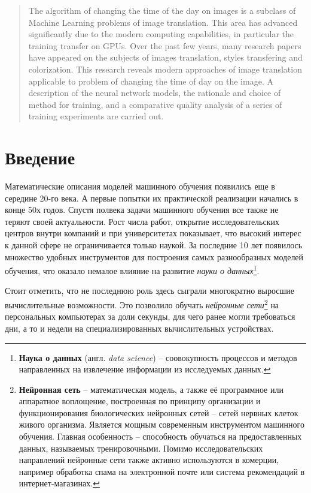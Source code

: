 \documentclass[11pt,a4paper]{extarticle}
\begin{document}
\begin{abstract}
	The algorithm of changing the time of the day on images is a subclass of Machine Learning problems of image translation.
	This area has advanced significantly due to the modern computing capabilities, in particular the training transfer on GPUs.
	Over the past few years, many research papers have appeared on the subjects of images translation, styles transfering and colorization.
	This research reveals modern approaches of image translation applicable to problem of changing the time of day on the image.
	A description of the neural network models, the rationale and choice of method for training, and a comparative quality analysis of a series of training experiments are carried out.
\end{abstract}

\newpage
\tableofcontents
\newpage

\section{Введение}
	Математические описания моделей машинного обучения появились еще в середине 20-го века.
	А первые попытки их практической реализации начались в конце 50х годов.
	Спустя полвека задачи машинного обучения все также не теряют своей актуальности.
	Рост числа работ, открытие исследовательских центров внутри компаний и при университетах показывает,
	что высокий интерес к данной сфере не ограничивается только наукой.
	За последние 10 лет появилось множество удобных инструментов для построения самых разнообразных моделей обучения, что оказало немалое влияние на развитие \textit{науки о данных}\footnote{
		\textbf{Наука о данных} (англ. \textit{data science}) -- соовокупность процессов и методов направленных на извлечение информации из исследуемых данных.
	}.  
	
	Стоит отметить, что не последнюю роль здесь сыграли многократно выросшие вычислительные возможности. 
	Это позволило обучать \textit{нейронные сети}\footnote{
		\textbf{Нейронная сеть} --  математическая модель, а также её программное или аппаратное воплощение, 
		построенная по принципу организации и функционирования биологических нейронных сетей -- сетей нервных клеток живого организма.
		Является мощным современным инструментом машинного обучения.
		Главная особенность -- способность обучаться на предоставленных данных, называемых тренировочными.
		Помимо исследовательских направлений нейронные сети также активно используются в комерции, например обработка спама на электронной почте или система рекомендаций в интернет-магазинах.
	} на персональных компьютерах за доли секунды, для чего ранее могли требоваться дни, а то и недели на специализированных вычислительных устройствах.
\end{document}
